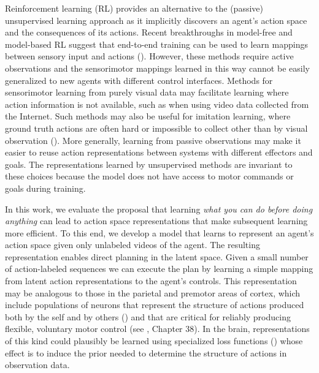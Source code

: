\documentclass{article} %
\begin{document}
Reinforcement learning (RL) provides an alternative to the (passive) unsupervised learning approach as it implicitly discovers an agent’s action space and the consequences of its actions. Recent breakthroughs in model-free and model-based RL suggest that end-to-end training can be used to learn mappings between sensory input and actions (\cite{mnih_nature_2015,lillicrap2015continuous,levine2016end,finn2017deep,schulman2015trust}). However, these methods require active observations and the sensorimotor mappings learned in this way cannot be easily generalized to new agents with different control interfaces. Methods for sensorimotor learning from purely visual data may facilitate learning where action information is not available, such as when using video data collected from the Internet. Such methods may also be useful for imitation learning, where ground truth actions are often hard or impossible to collect other than by visual observation (\cite{finn2017one, pathak2018zero}). More generally, learning from passive observations may make it easier to reuse action representations between systems with different effectors and goals. The representations learned by unsupervised methods are invariant to these choices because the model does not have access to motor commands or goals during training.

In this work, we evaluate the proposal that learning \textit{what you can do before doing anything} can lead to action space representations that make subsequent learning more efficient. To this end, we develop a model that learns to represent an agent’s action space given only unlabeled videos of the agent. The resulting representation enables direct planning in the latent space. Given a small number of action-labeled sequences we can execute the plan by learning a simple mapping from latent action representations to the agent’s controls.
This representation may be analogous to those in the parietal and premotor areas of cortex, which include populations of neurons that represent the structure of actions produced both by the self and by others (\cite{rizzolatti_premotor_1996, romo_neuron_2004}) and that are critical for reliably producing flexible, voluntary motor control (see \cite{kandel_principles_2012}, Chapter 38). In the brain, representations of this kind could plausibly be learned using specialized loss functions (\cite{marblestone2016toward}) whose effect is to induce the prior needed to determine the structure of actions in observation data.
\end{document}
